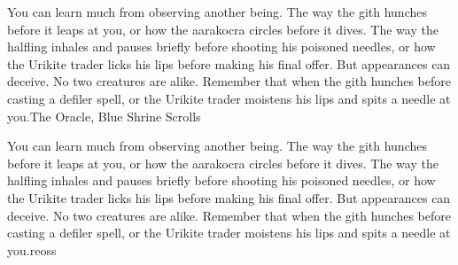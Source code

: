 \documentclass[10pt,a4paper,twocolumn]{d20}
\begin{document}
{You can learn much from observing another being. The way the gith hunches before it leaps at you, or how the aarakocra circles before it dives. The way the halfling inhales and pauses briefly before shooting his poisoned needles, or how the Urikite trader licks his lips before making his final offer. But appearances can deceive. No two creatures are alike. Remember that when the gith hunches before casting a defiler spell, or the Urikite trader moistens his lips and spits a needle at you.}{The Oracle, Blue Shrine Scrolls}


{You can learn much from observing another being. The way the gith hunches before it leaps at you, or how the aarakocra circles before it dives. The way the halfling inhales and pauses briefly before shooting his poisoned needles, or how the Urikite trader licks his lips before making his final offer. But appearances can deceive. No two creatures are alike. Remember that when the gith hunches before casting a defiler spell, or the Urikite trader moistens his lips and spits a needle at you.}{reoss}

\end{document}
